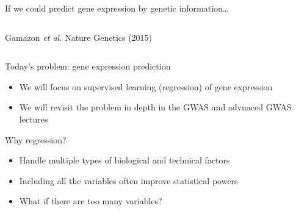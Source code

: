 \documentclass[
  ignorenonframetext,
  aspectratio=169]{beamer}
\begin{document}
\begin{frame}{If we could predict gene expression by genetic
information\ldots{}}
\begin{columns}[T]
\begin{column}{.45\textwidth}
{}

\normalsize

\tiny Gamazon \emph{et al.} Nature Genetics (2015)
\end{column}
\end{columns}
\end{frame}

\begin{frame}{Today's problem: gene expression prediction}
\protect\hypertarget{todays-problem-gene-expression-prediction}{}
\Large

\begin{itemize}
\item
  We will focus on supervised learning (regression) of gene expression
\item
  We will revisit the problem in depth in the GWAS and advnaced GWAS
  lectures
\end{itemize}
\end{frame}

\begin{frame}{Why regression?}
\protect\hypertarget{why-regression}{}
\scriptsize


\normalsize

\begin{itemize}
\item
  Handle multiple types of biological and technical factors
\item
  Including all the variables often improve statistical powers
\item
  What if there are too many variables?
\end{itemize}

\vfill

\end{frame}
\end{document}

